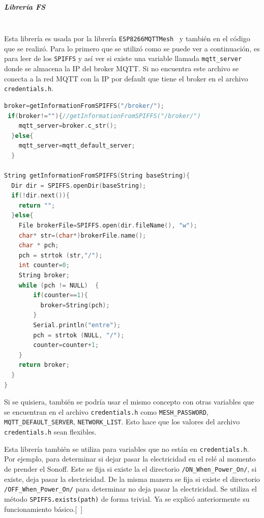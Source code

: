 \subparagraph{Librería FS}~\mbox{}\\

Esta librería es usada por la librería \lstinline[columns=fixed]{ESP8266MQTTMesh}~ y también en el código que se realizó. Para lo primero que se utilizó como se puede ver a continuación,  es para leer de los \lstinline[columns=fixed]{SPIFFS} y así ver si existe una variable llamada \lstinline[columns=fixed]{mqtt_server} donde se almacena la IP del broker MQTT. Si no encuentra este archivo se conecta a  la red MQTT con la IP por default que tiene el broker en el archivo \lstinline[columns=fixed]{credentials.h}.

\begin{lstlisting}[language=C]
broker=getInformationFromSPIFFS("/broker/");
 if(broker!=""){//getInformationFromSPIFFS("/broker/")
    mqtt_server=broker.c_str();
  }else{
    mqtt_server=mqtt_default_server;
  }

String getInformationFromSPIFFS(String baseString){
  Dir dir = SPIFFS.openDir(baseString);
  if(!dir.next()){
    return "";
  }else{
    File brokerFile=SPIFFS.open(dir.fileName(), "w");
    char* str=(char*)brokerFile.name();
    char * pch;
    pch = strtok (str,"/");
    int counter=0;
    String broker;
    while (pch != NULL)  {
        if(counter==1){
          broker=String(pch);
        }
        Serial.println("entre");
        pch = strtok (NULL, "/");
        counter=counter+1;
    }
    return broker;
  }
}
\end{lstlisting}

Si se quisiera, también se podría usar el mismo concepto con otras variables que se encuentran en el archivo \lstinline[columns=fixed]{credentials.h} como \lstinline[columns=fixed]{MESH_PASSWORD}, \lstinline[columns=fixed]{MQTT_DEFAULT_SERVER}, \lstinline[columns=fixed]{NETWORK_LIST}. Esto hace que los valores del archivo \lstinline[columns=fixed]{credentials.h} sean flexibles. 

Esta librería también se utiliza para variables que no están en \lstinline[columns=fixed]{credentials.h}. Por ejemplo, para determinar si dejar pasar la electricidad en el relé al momento de prender el Sonoff. Este se fija si existe la el directorio \lstinline[columns=fixed]{/ON_When_Power_On/}, si existe, deja pasar la electricidad. De la misma manera se fija si existe el directorio \lstinline[columns=fixed]{/OFF_When_Power_On/} para determinar no deja pasar la electricidad. Se utiliza el método \lstinline[columns=fixed]{SPIFFS.exists(path)} de forma trivial. Ya se explicó anteriormente su funcionamiento básico.[~]


